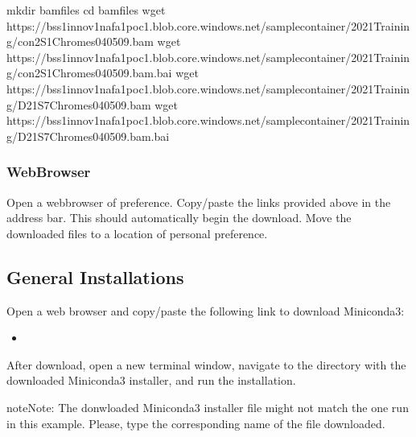 \documentclass[letterpaper,10pt,english]{sphinxhowto}
\begin{document}
\begin{sphinxVerbatim}[commandchars=\\\{\}]
\PYGZdl{} mkdir bam\PYGZus{}files
\PYGZdl{} cd bam\PYGZus{}files
\PYGZdl{} wget https://bss1innov1nafa1poc1.blob.core.windows.net/sample\PYGZhy{}container/2021\PYGZus{}Training/con\PYGZhy{}2\PYGZus{}S1\PYGZhy{}Chromes\PYGZhy{}04\PYGZhy{}05\PYGZhy{}09.bam
\PYGZdl{} wget https://bss1innov1nafa1poc1.blob.core.windows.net/sample\PYGZhy{}container/2021\PYGZus{}Training/con\PYGZhy{}2\PYGZus{}S1\PYGZhy{}Chromes\PYGZhy{}04\PYGZhy{}05\PYGZhy{}09.bam.bai
\PYGZdl{} wget https://bss1innov1nafa1poc1.blob.core.windows.net/sample\PYGZhy{}container/2021\PYGZus{}Training/D2\PYGZhy{}1\PYGZus{}S7\PYGZhy{}Chromes\PYGZhy{}04\PYGZhy{}05\PYGZhy{}09.bam
\PYGZdl{} wget https://bss1innov1nafa1poc1.blob.core.windows.net/sample\PYGZhy{}container/2021\PYGZus{}Training/D2\PYGZhy{}1\PYGZus{}S7\PYGZhy{}Chromes\PYGZhy{}04\PYGZhy{}05\PYGZhy{}09.bam.bai
\end{sphinxVerbatim}


\subsubsection{Web\sphinxhyphen{}Browser}
\label{\detokenize{index:web-browser}}
\sphinxAtStartPar
Open a web\sphinxhyphen{}browser of preference. Copy/paste the links provided above in the address bar. This should automatically begin the download. Move the downloaded files to a location of personal preference.


\subsection{General Installations}
\label{\detokenize{index:general-installations}}
\sphinxAtStartPar
Open a web browser and copy/paste the following link to download Miniconda3:
\begin{itemize}
\item {} 
\sphinxAtStartPar
{}

\end{itemize}

\sphinxAtStartPar
After download, open a new terminal window, navigate to the directory with the downloaded Miniconda3 installer, and run the installation.

\begin{sphinxadmonition}{note}{Note:}
\sphinxAtStartPar
The donwloaded Miniconda3 installer file might not match the one run in this example. Please, type the corresponding name of the  file downloaded.
\end{sphinxadmonition}
\end{document}
